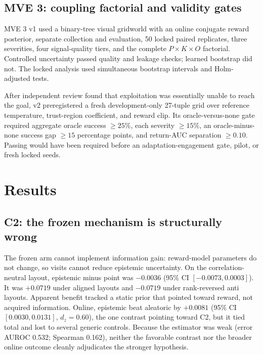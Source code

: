 \documentclass{article}
\begin{document}
\subsection{MVE 3: coupling factorial and validity gates}
MVE 3 v1 used a binary-tree visual gridworld with an online conjugate reward posterior, separate collection and evaluation, 50 locked paired replicates, three severities, four signal-quality tiers, and the complete $P\times K\times O$ factorial. Controlled uncertainty passed quality and leakage checks; learned bootstrap did not. The locked analysis used simultaneous bootstrap intervals and Holm-adjusted tests.

After independent review found that exploitation was essentially unable to reach the goal, v2 preregistered a fresh development-only 27-tuple grid over reference temperature, trust-region coefficient, and reward clip. Its oracle-versus-none gate required aggregate oracle success $\geq25\%$, each severity $\geq15\%$, an oracle-minus-none success gap $\geq15$ percentage points, and return-AUC separation $\geq0.10$. Passing would have been required before an adaptation-engagement gate, pilot, or fresh locked seeds.

\section{Results}
\subsection{C2: the frozen mechanism is structurally wrong}
The frozen arm cannot implement information gain: reward-model parameters do not change, so visits cannot reduce epistemic uncertainty. On the correlation-neutral layout, epistemic minus point was $-0.0036$ (95\% CI $[-0.0073,0.0003]$). It was $+0.0719$ under aligned layouts and $-0.0719$ under rank-reversed anti layouts. Apparent benefit tracked a static prior that pointed toward reward, not acquired information. Online, epistemic beat aleatoric by $+0.0081$ (95\% CI $[0.0030,0.0131]$, $d_z=0.60$), the one contrast pointing toward C2, but it tied total and lost to several generic controls. Because the estimator was weak (error AUROC 0.532; Spearman 0.162), neither the favorable contrast nor the broader online outcome cleanly adjudicates the stronger hypothesis.
\end{document}
